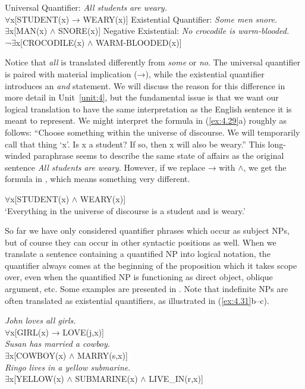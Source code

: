 \ea \label{ex:4.29}
\ea  Universal Quantifier: \textit{All students} \textit{are weary.}\\
${\forall}$x[STUDENT(x) → WEARY(x)]
\ex  Existential Quantifier: \textit{Some men} \textit{snore.}\\
${\exists}$x[MAN(x) $\wedge$ SNORE(x)]
\ex  Negative Existential: \textit{No crocodile is warm-blooded.}\\
¬${\exists}$x[CROCODILE(x) $\wedge$ WARM-BLOODED(x)]
\z \z

Notice that \textit{all} is translated differently from \textit{some} or \textit{no}. The universal quantifier is paired with material implication (→), while the existential quantifier introduces an \textit{and} statement. We will discuss the reason for this difference in more detail in Unit~\ref{unit:4}, but the fundamental issue is that we want our logical translation to have the same interpretation as the English sentence it is meant to represent. We might interpret the formula in (\ref{ex:4.29}a) roughly as follows: “Choose something within the universe of discourse. We will temporarily call that thing ‘x’. Is x a student? If so, then x will also be weary.” This long-winded paraphrase seems to describe the same state of affairs as the original sentence \textit{All students} \textit{are weary}. However, if we replace → with $\wedge$, we get the formula in , which means something very different.

\ea \label{ex:4.30}
${\forall}$x[STUDENT(x) $\wedge$ WEARY(x)]\\
‘Everything in the universe of discourse is a student and is weary.’
\z


So far we have only considered quantifier phrases which occur as subject NPs, but of course they can occur in other syntactic positions as well. When we translate a sentence containing a quantified NP into logical notation, the quantifier always comes at the beginning of the proposition which it takes scope over, even when the quantified NP is functioning as direct object, oblique argument, etc. Some examples are presented in . Note that indefinite NPs are often translated as existential quantifiers, as illustrated in (\ref{ex:4.31}b--c).


\ea \label{ex:4.31}
\ea \textit{John loves all girls.}\\
  ${\forall}$x[GIRL(x) → LOVE(j,x)]\\
\ex \textit{Susan has married a cowboy.}\\
  ${\exists}$x[COWBOY(x) $\wedge$ MARRY(s,x)]\\
\ex \textit{Ringo lives in a yellow submarine}.\\
  ${\exists}$x[YELLOW(x) $\wedge$ SUBMARINE(x) ${\wedge}$ LIVE\_IN(r,x)]
                       \z
\z


